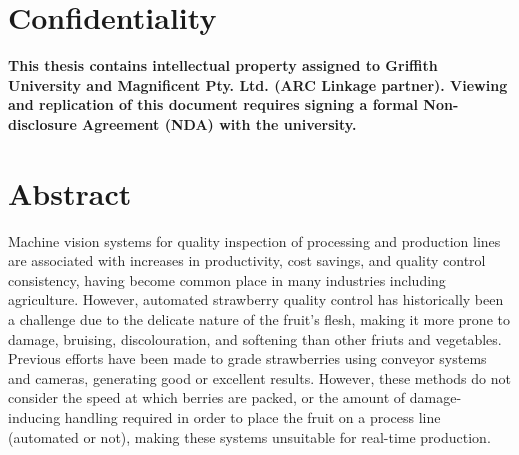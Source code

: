 \documentclass[fleqn,twoside,12pt]{report}
\begin{document}
\restoregeometry




\chapter*{Confidentiality}

\textbf{This thesis contains intellectual property assigned to Griffith University and Magnificent Pty. Ltd. (ARC Linkage partner). Viewing and replication of this document requires signing a formal Non-disclosure Agreement (NDA) with the university.} \\[0.5cm] %


\vfill







\chapter*{Abstract}



Machine vision systems for quality inspection of processing and production lines are associated with increases in productivity, cost savings, and quality control consistency, having become common place in many industries including agriculture. However, automated strawberry quality control has historically been a challenge due to the delicate nature of the fruit's flesh, making it more prone to damage, bruising, discolouration, and softening than other friuts and vegetables. Previous efforts have been made to grade strawberries using conveyor systems and cameras, generating good or excellent results. However, these methods do not consider the speed at which berries are packed, or the amount of damage-inducing handling required in order to place the fruit on a process line (automated or not), making these systems unsuitable for real-time production. 
\end{document}

